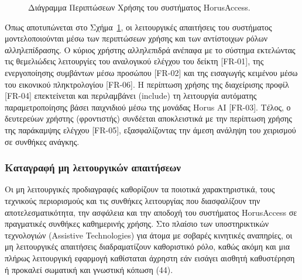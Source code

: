 \documentclass[twoside, a4paper, 11pt]{article}
\newcommand{\textlatin}[1]{\textenglish{#1}}
\begin{document}
\begin{figure}[!htbp]
\caption{Διάγραμμα Περιπτώσεων Χρήσης του συστήματος HorusAccess.}
\label{fig:use_case_diagram}
\end{figure}


Όπως αποτυπώνεται στο Σχήμα~\ref{fig:use_case_diagram}, οι λειτουργικές απαιτήσεις του συστήματος μοντελοποιούνται μέσω των περιπτώσεων χρήσης και των αντίστοιχων ρόλων αλληλεπίδρασης. Ο κύριος χρήστης αλληλεπιδρά ανέπαφα με το σύστημα εκτελώντας τις θεμελιώδεις λειτουργίες του αναλογικού ελέγχου του δείκτη [FR-01], της ενεργοποίησης συμβάντων μέσω προσώπου [FR-02] και της εισαγωγής κειμένου μέσω του εικονικού πληκτρολογίου [FR-06]. Η περίπτωση χρήσης της διαχείρισης προφίλ [FR-04] επεκτείνεται και περιλαμβάνει (\textlatin{\guillemotleft include\guillemotright}) τη λειτουργία αυτόματης παραμετροποίησης βάσει παιχνιδιού μέσω της μονάδας \textlatin{Horus AI} [FR-03]. Τέλος, ο δευτερεύων χρήστης (φροντιστής) συνδέεται αποκλειστικά με την περίπτωση χρήσης της παράκαμψης ελέγχου [FR-05], εξασφαλίζοντας την άμεση ανάληψη του χειρισμού σε συνθήκες ανάγκης.

\subsubsection{Καταγραφή μη λειτουργικών απαιτήσεων}
Οι μη λειτουργικές προδιαγραφές καθορίζουν τα ποιοτικά χαρακτηριστικά, τους τεχνικούς περιορισμούς και τις συνθήκες λειτουργίας που διασφαλίζουν την αποτελεσματικότητα, την ασφάλεια και την αποδοχή του συστήματος \textlatin{HorusAccess} 
σε πραγματικές συνθήκες καθημερινής χρήσης. Στο πλαίσιο των υποστηρικτικών τεχνολογιών (\textlatin{Assistive Technologies}) για άτομα με σοβαρές κινητικές αναπηρίες, οι μη λειτουργικές απαιτήσεις διαδραματίζουν καθοριστικό ρόλο, καθώς ακόμη και μια πλήρως λειτουργική εφαρμογή καθίσταται
 άχρηστη εάν εισάγει αισθητή καθυστέρηση ή προκαλεί σωματική και γνωστική κόπωση (44).
\end{document}
